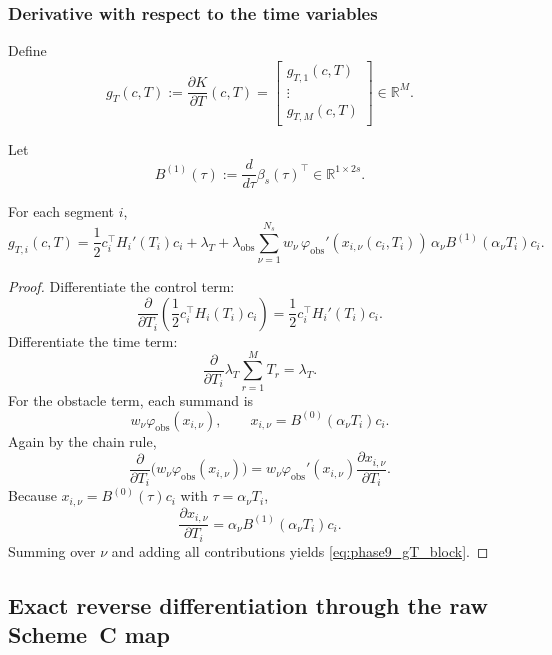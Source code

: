 \subsubsection{Derivative with respect to the time variables}
\label{subsubsec:phase9_dKdT}

Define
\[
g_T(c,T):=
\frac{\partial K}{\partial T}(c,T)
=
\begin{bmatrix}
g_{T,1}(c,T)\\
\vdots\\
g_{T,M}(c,T)
\end{bmatrix}
\in\mathbb R^M.
\]

Let
\[
B^{(1)}(\tau):=\frac{d}{d\tau}\beta_s(\tau)^\top\in\mathbb R^{1\times 2s}.
\]

\begin{proposition}
\label{prop:phase9_dKdT}
For each segment \(i\),
\begin{equation}
\label{eq:phase9_gT_block}
g_{T,i}(c,T)
=
\frac12 c_i^\top H_i'(T_i)c_i
+
\lambda_T
+
\lambda_{\mathrm{obs}}
\sum_{\nu=1}^{N_s}
w_\nu\,
\varphi_{\mathrm{obs}}'(x_{i,\nu}(c_i,T_i))
\,
\alpha_\nu B^{(1)}(\alpha_\nu T_i)c_i.
\end{equation}
\end{proposition}

\begin{proof}
Differentiate the control term:
\[
\frac{\partial}{\partial T_i}
\left(\frac12 c_i^\top H_i(T_i)c_i\right)
=
\frac12 c_i^\top H_i'(T_i)c_i.
\]
Differentiate the time term:
\[
\frac{\partial}{\partial T_i}\lambda_T\sum_{r=1}^{M}T_r=\lambda_T.
\]
For the obstacle term, each summand is
\[
w_\nu \varphi_{\mathrm{obs}}(x_{i,\nu}),
\qquad
x_{i,\nu}=B^{(0)}(\alpha_\nu T_i)c_i.
\]
Again by the chain rule,
\[
\frac{\partial}{\partial T_i}
\bigl(w_\nu \varphi_{\mathrm{obs}}(x_{i,\nu})\bigr)
=
w_\nu \varphi_{\mathrm{obs}}'(x_{i,\nu})
\frac{\partial x_{i,\nu}}{\partial T_i}.
\]
Because \(x_{i,\nu}=B^{(0)}(\tau)c_i\) with \(\tau=\alpha_\nu T_i\),
\[
\frac{\partial x_{i,\nu}}{\partial T_i}
=
\alpha_\nu B^{(1)}(\alpha_\nu T_i)c_i.
\]
Summing over \(\nu\) and adding all contributions yields \eqref{eq:phase9_gT_block}.
\end{proof}

\subsection{Exact reverse differentiation through the raw Scheme~C map}
\label{subsec:phase9_reverse_diff}

